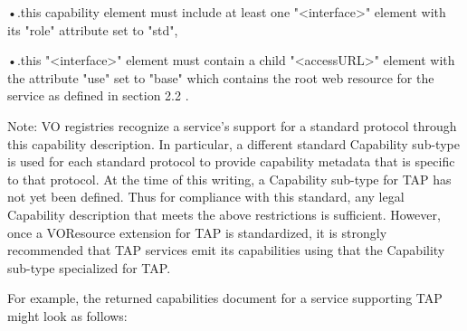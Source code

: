 \documentclass[11pt,a4paper]{ivoa}
\begin{document}
    •.this capability element must include at least one "<interface>" element 
with its "role" attribute set to "std",  

    •.this "<interface>" element must contain a child "<accessURL>" element with 
the attribute "use" set to "base" which contains the root web resource for the 
service as defined in section 2.2 . 

Note: VO registries recognize a service's support for a standard protocol 
through this capability description. In particular, a different standard 
Capability sub-type is used for each standard protocol to provide capability 
metadata that is specific to that protocol. At the time of this writing, a 
Capability sub-type for TAP has not yet been defined. Thus for compliance with 
this standard, any legal Capability description that meets the above 
restrictions is sufficient. However, once a VOResource extension for TAP is 
standardized, it is strongly recommended that TAP services emit its capabilities 
using that the Capability sub-type specialized for TAP.

For example, the returned capabilities document for a service supporting    TAP 
might look as follows:
\end{document}
